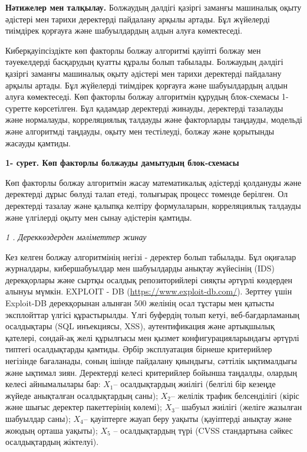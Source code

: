 {\bfseries Нәтижелер мен талқылау.} Болжаудың дәлдігі қазіргі заманғы
машиналық оқыту әдістері мен тарихи деректерді пайдалану арқылы артады.
Бұл жүйелерді тиімдірек қорғауға және шабуылдардың алдын алуға
көмектеседі.

Киберқауіпсіздікте көп факторлы болжау алгоритмі қауіпті болжау мен
тәуекелдерді басқарудың қуатты құралы болып табылады. Болжаудың дәлдігі
қазіргі заманғы машиналық оқыту әдістері мен тарихи деректерді пайдалану
арқылы артады. Бұл жүйелерді тиімдірек қорғауға және шабуылдардың алдын
алуға көмектеседі. Көп факторлы болжау алгоритмін құрудың блок-схемасы
1-суретте көрсетілген. Бұл қадамдар деректерді жинауды, деректерді
тазалауды және нормалауды, корреляциялық талдауды және факторларды
таңдауды, модельді және алгоритмді таңдауды, оқыту мен тестілеуді,
болжау және қорытынды жасауды қамтиды.

{\bfseries 1- сурет. Көп факторлы болжауды дамытудың блок-схемасы}

Көп факторлы болжау алгоритмін жасау математикалық әдістерді қолдануды
және деректерді дұрыс бөлуді талап етеді, толығырақ процесс төменде
берілген. Ол деректерді тазалау және қалыпқа келтіру формулаларын,
корреляциялық талдауды және үлгілерді оқыту мен сынау әдістерін қамтиды.

\emph{1 . Дереккөздерден мәліметтер жинау}

Кез келген болжау алгоритмінің негізі - деректер болып табылады. Бұл
оқиғалар журналдары, кибершабуылдар мен шабуылдарды анықтау жүйесінің
(IDS) дерекқорлары және сыртқы осалдық репозиторийлері сияқты әртүрлі
көздерден алынуы мүмкін. EXPLOIT - DB
(\href{https://www.exploit-db.com/\%20}{https://www.exploit-db.com/}).
Зерттеу үшін Exploit-DB дерекқорынан алынған 500 желінің осал тұстары
мен қатысты эксплойттар үлгісі құрастырылды. Үлгі буфердің толып кетуі,
веб-бағдарламаның осалдықтары (SQL инъекциясы, XSS), аутентификация және
артықшылық қателері, сондай-ақ желі құрылғысы мен қызмет
конфигурацияларындағы әртүрлі типтегі осалдықтарды қамтиды. Әрбір
эксплуатация бірнеше критерийлер негізінде бағаланады, соның ішінде
пайдалану қиындығы, сәттілік ықтималдығы және ықтимал зиян. Деректерді
келесі критерийлер бойынша таңдалды, олардың келесі айнымалылары бар:
\(X_{1}\)-- осалдықтардың жиілігі (белгілі бір кезеңде жүйеде анықталған
осалдықтардың саны); \(X_{2}\)-- желілік трафик белсенділігі (кіріс және
шығыс деректер пакеттерінің көлемі); \(X_{3}\)-- шабуыл жиілігі (желіге
жазылған шабуылдар саны); \(X_{4}\)-- қауіптерге жауап беру уақыты
(қауіптерді анықтау және жоюдың орташа уақыты); \(X_{5}\) --
осалдықтардың түрі (CVSS стандартына сәйкес осалдықтардың жіктелуі).

